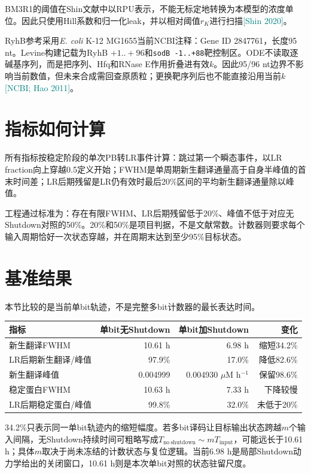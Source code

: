 \documentclass[UTF8,a4paper,11pt,fontset=windows]{ctexart}
\newcommand{\citebox}[1]{\textcolor{Teal}{[#1]}}
\begin{document}
BM3R1的阈值在Shin文献中以RPU表示，不能无标定地转换为本模型的浓度单位。因此只使用Hill系数和归一化leak，并以相对阈值$r_K$进行扫描\citebox{Shin 2020}。

RyhB参考采用\textit{E. coli} K-12 MG1655当前NCBI注释：Gene ID 2847761，长度95 nt。Levine构建记载为RyhB $+1..+96$和\nolinkurl{sodB -1..+88}靶控制区。ODE不读取逐碱基序列，而是把序列、Hfq和RNase E作用折叠进有效$k$。因此95/96 nt边界不影响当前数值，但未来合成需回查原质粒；更换靶序列后也不能直接沿用当前$k$\citebox{NCBI; Hao 2011}。

\section{指标如何计算}
所有指标按稳定阶段的单次PB转LR事件计算：跳过第一个瞬态事件，以LR fraction向上穿越0.5定义开始；FWHM是单周期新生翻译通量高于自身半峰值的首末时间差；LR后期残留是LR仍有效时最后20\%区间的平均新生翻译通量除以峰值。

工程通过标准为：存在有限FWHM、LR后期残留低于20\%、峰值不低于对应无Shutdown对照的50\%。20\%和50\%是项目判据，不是文献常数。计数器则要求每个输入周期恰好一次状态穿越，并在周期末达到至少95\%目标状态。

\section{基准结果}
本节比较的是当前单bit轨迹，不是完整多bit计数器的最长表达时间。
\begin{table}[H]\centering
\begin{tabular}{@{}lrrr@{}}\toprule
指标 & 单bit无Shutdown & 单bit加Shutdown & 变化\\\midrule
新生翻译FWHM & 10.61 h & 6.98 h & 缩短34.2\%\\
LR后期新生翻译/峰值 & 97.9\% & 17.0\% & 降低82.6\%\\
新生翻译峰值 & 0.004999 & 0.004930 $\mu$M h$^{-1}$ & 保留98.6\%\\
稳定蛋白FWHM & 10.63 h & 7.33 h & 下降较慢\\
LR后期稳定蛋白/峰值 & 99.8\% & 32.0\% & 未低于20\%\\
\bottomrule\end{tabular}
\end{table}

34.2\%只表示同一单bit轨迹内的缩短幅度。若多bit译码让目标输出状态跨越$m$个输入间隔，无Shutdown持续时间可粗略写成$T_{\mathrm{no\ shutdown}}\sim mT_{\mathrm{input}}$，可能远长于10.61 h；具体$m$取决于尚未冻结的计数状态与复位逻辑。当前6.98 h是局部Shutdown动力学给出的关闭窗口，10.61 h则是本次单bit对照的状态驻留尺度。
\end{document}
